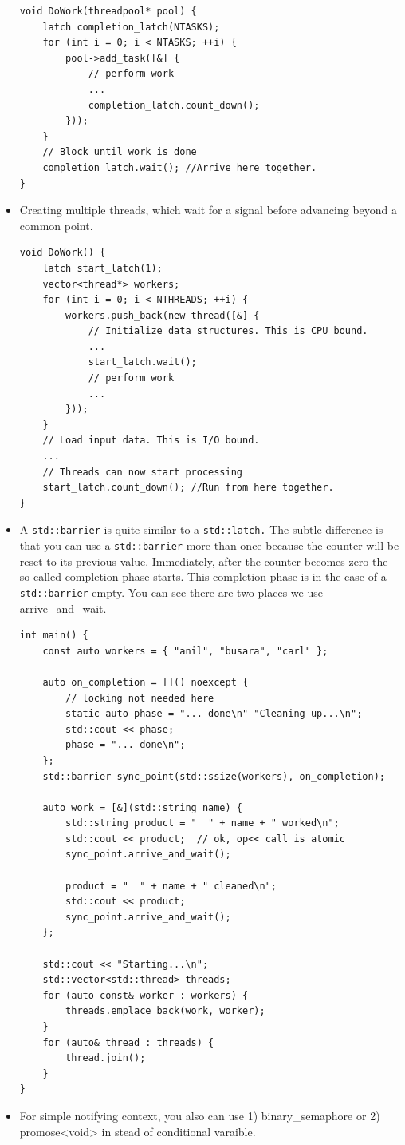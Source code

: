 \documentclass[a4paper,11pt,twoside]{book}
\begin{document}
\begin{itemize}
\begin{lstlisting}[numbers=none]
void DoWork(threadpool* pool) {
	latch completion_latch(NTASKS);
	for (int i = 0; i < NTASKS; ++i) {
		pool->add_task([&] {
			// perform work
			...
			completion_latch.count_down();
		}));
	}
	// Block until work is done
	completion_latch.wait(); //Arrive here together.
}
\end{lstlisting}	

	\item Creating multiple threads, which wait for a signal before advancing beyond a common point.
\begin{lstlisting}[numbers=none]
void DoWork() {
	latch start_latch(1);
	vector<thread*> workers;
	for (int i = 0; i < NTHREADS; ++i) {
		workers.push_back(new thread([&] {
			// Initialize data structures. This is CPU bound.
			...
			start_latch.wait();
			// perform work
			...
		}));
	}
	// Load input data. This is I/O bound.
	...
	// Threads can now start processing
	start_latch.count_down(); //Run from here together.
}
\end{lstlisting}

\item A \texttt{std::barrier} is quite similar to a \texttt{std::latch.} The subtle difference is that you can use a  \texttt{std::barrier} more than once because the counter will be reset to its previous value. Immediately, after the counter becomes zero the so-called completion phase starts. This completion phase is in the case of a \texttt{std::barrier} empty. You can see there are two places we use arrive\_and\_wait. 

\begin{lstlisting}[numbers=none]
int main() {
	const auto workers = { "anil", "busara", "carl" };
	
	auto on_completion = []() noexcept { 
		// locking not needed here
		static auto phase = "... done\n" "Cleaning up...\n";
		std::cout << phase;
		phase = "... done\n";
	};
	std::barrier sync_point(std::ssize(workers), on_completion);
	
	auto work = [&](std::string name) {
		std::string product = "  " + name + " worked\n";
		std::cout << product;  // ok, op<< call is atomic
		sync_point.arrive_and_wait();
		
		product = "  " + name + " cleaned\n";
		std::cout << product;
		sync_point.arrive_and_wait();
	};
	
	std::cout << "Starting...\n";
	std::vector<std::thread> threads;
	for (auto const& worker : workers) {
		threads.emplace_back(work, worker);
	}
	for (auto& thread : threads) {
		thread.join();
	}
}
\end{lstlisting}
    \item For simple notifying context, you also can use 1) binary\_semaphore or 2) promose<void> in stead of conditional varaible.

\end{itemize}
\end{document}
